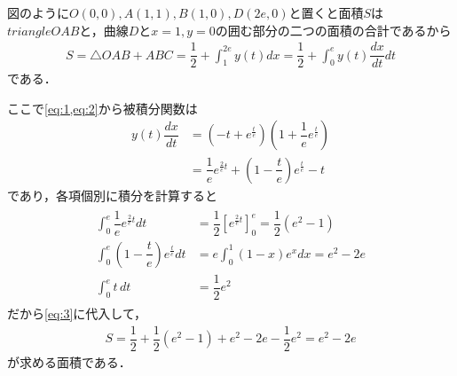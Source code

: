 \documentclass[../../main.tex]{subfiles}
\begin{document}
図のように$O(0,0), A(1,1), B(1,0), D(2e,0)$と置くと面積$S$は$triangle OAB$と，曲線$D$と$x=1, y=0$の囲む部分の二つの面積の合計であるから
\begin{align}
  S=\triangle OAB + ABC = \dfrac{1}{2}+\int_1^{2e}y(t)dx=\dfrac{1}{2}+\int_0^ey(t)\dfrac{dx}{dt}dt  \label{eq:3}
\end{align}
である．

ここで\cref{eq:1,eq:2}から被積分関数は
\begin{align}
  y(t)\dfrac{dx}{dt}
  &=\left(-t+e^{\frac{t}{e}}\right)\left(1+\dfrac{1}{e}e^{\frac{t}{e}}\right) \\
  &=\dfrac{1}{e}e^{\frac{2}{e}t}+\left(1-\dfrac{t}{e}\right)e^{\frac{t}{e}}-t \label{eq:4}
\end{align}
であり，各項個別に積分を計算すると
\begin{align}
  \begin{split}
    \int_0^e\dfrac{1}{e}e^{\frac{2}{e}t}dt&=\dfrac{1}{2}\left[e^{\frac{2}{e}t}\right]_0^e=\dfrac{1}{2}(e^2-1) \\
    \int_0^e\left(1-\dfrac{t}{e}\right)e^{\frac{t}{e}}dt&=e\int_0^1(1-x)e^xdx=e^2-2e \\
    \int_0^et\,dt&=\dfrac{1}{2}e^2
  \end{split}
\end{align}
だから\cref{eq:3}に代入して，
\begin{align}
  S = \dfrac{1}{2} + \dfrac{1}{2}(e^2-1)+e^2-2e-\dfrac{1}{2}e^2=e^2-2e
\end{align}
が求める面積である．

\newpage
\end{document}
